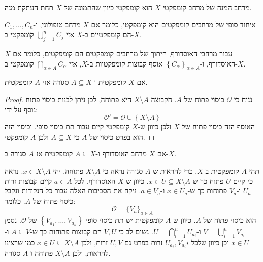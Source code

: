 \documentclass{tstextbook}
\begin{document}
\begin{corollary}
מרחב המנה של מרחב קומפקטי \(X\) הוא קומפקטי כיוון שהתמונה של \(X\) תחת העתקת מנה.

\end{corollary}
\begin{proposition}
איחוד סופי של מרחבים קומפקטים הוא קומפקטי, כלומר אם \(X\) מרחב טופולוגי, ו-\(C_{1},\dots,C_{n}\) הם קומפקטיים ב-\(X\) אזי \(\bigcup_{j=1}^{n}C_{j}\) קומפקטי ב-\(X\). 

\end{proposition}
\begin{proposition}
עבור מרחבי האוסדורף, חיתוך של מרחבים קומפקטים הם קומפקטים, כלומר אם \(X\) האוסדורף, ו-\(\left\{  C_{\alpha}  \right\}_{\alpha \in A}\) אוסף קבוצות קומפקטיות ב-\(X\), אזי \(\bigcap_{\alpha \in A}C_{\alpha}\) קומפקטי ב-\(X\).

\end{proposition}
\begin{proposition}
אם \(X\) קומפקטית ו-\(A\subseteq X\) סגורה אזי \(A\) קומפקטית.

\end{proposition}
\begin{proof}
נניח כי \(\mathcal{O}\) כיסוי פתוח של \(A\). הקבוצה \(X\setminus A\) היא פתוחה, לכן ניתן לבנות כיסוי פתוח נוסף על ידי:
$$\mathcal{O} '=\mathcal{O}\cup \left\{  X\setminus A  \right\} $$
האוסף הזה כיסוי פתוח של \(X\) ולכן כיוון ש-\(X\) קומפקטי קיים עבור תת כיסוי סופי. וכיסוי הזה הוא בפרט כיסוי של \(A\) כי \(A\subseteq X\) ולכן \(A\) קומפקטי.

\end{proof}
\begin{proposition}
אם \(X\) מרחב האוסדורף ו-\(A\subseteq X\) קומפקטית אז \(A\) סגורה ב-\(X\).

\end{proposition}
תהי \(A\) קומפקטית ב-\(X\). כדי להראות ש-\(A\) סגורה נראה כי \(X\setminus A\) פתוחה. יהי \(x \in X\setminus A\). נראה כי קיים \(U\) פתוח כך ש-\(x \in U\subseteq X \setminus A\). כיוון ש-\(X\) האוסדורף, לכל \(a \in A\) קיים קבוצות זרות \(U_{a}\) ו-\(V_{a}\) פתוחות כך ש-\(x \in U_{a}\) ו-\(a \in V_{a}\). ניקח את הסביבות האלה עבור כל הנקודות ונקבל כיסוי פתוח של \(A\). כלומר:
$$\mathcal{O} =\{ V_{a} \}_{a \in A}$$
הוא כיסוי פתוח של \(A\). כיוון ש-\(A\) קומפקטית יש תת כיסוי סופי \(\left\{  V_{a_{1}},\dots,V_{a_{n}}  \right\}\) של \(\mathcal{O}\). נסמן \(V=\bigcup_{i=1}^{n}V_{a_{i}}\) ו-\(U=\bigcap_{i=1}^{n}U_{a_{i}}\). נשים לב כי \(V,U\) הם קבוצות פתוחות כך ש-\(A\subseteq V\) ו-\(x \in U\) וכן כיוון שלכל \(i\)\(U_{a_{i}},V_{a_{i}}\) זרות בפרט גם \(U,V\) זרות, ולכן \(x \in U \subseteq X \setminus A\) כמו שרצינו להראות, ולכן \(X\setminus A\) פתוחה ו-\(A\) סגורה.
\end{document}
